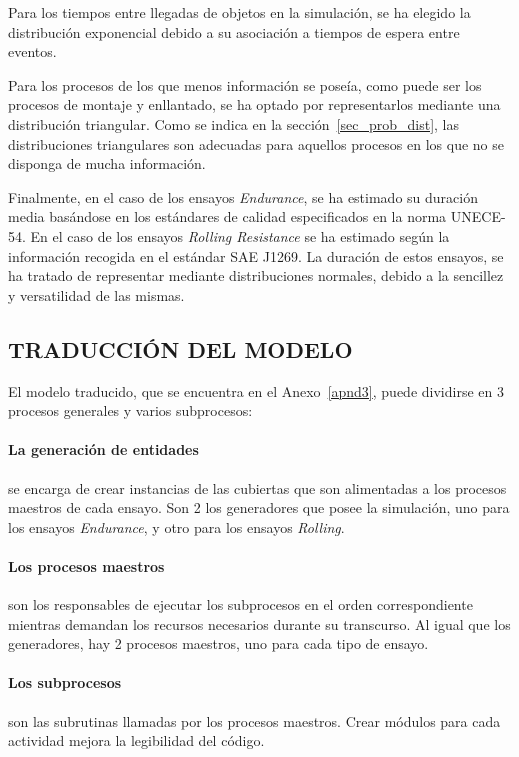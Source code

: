 Para los tiempos entre llegadas de objetos en la simulación,
se ha elegido la distribución exponencial debido a
su asociación a tiempos de espera entre eventos.

Para los procesos de los que menos información se poseía,
como puede ser los procesos de montaje y enllantado,
se ha optado por representarlos mediante una distribución triangular.
Como se indica en la sección~\ref{sec_prob_dist},
las distribuciones triangulares son adecuadas para aquellos procesos en los que no se disponga de mucha información.

Finalmente, en el caso de los ensayos \textit{Endurance},
se ha estimado su duración media basándose en los estándares de calidad
especificados en la norma UNECE-54.
En el caso de los ensayos \textit{Rolling Resistance}
se ha estimado según la información recogida en el estándar SAE J1269.
La duración de estos ensayos,
se ha tratado de representar mediante distribuciones normales,
debido a la sencillez y versatilidad de las mismas.

\subsection{TRADUCCIÓN DEL MODELO}

El modelo traducido, que se encuentra en el Anexo~\ref{apnd3},
puede dividirse en 3 procesos generales y varios subprocesos:

\paragraph{La generación de entidades}
se encarga de crear instancias de las cubiertas que son alimentadas
a los procesos maestros de cada ensayo.
Son 2 los generadores que posee la simulación,
uno para los ensayos \textit{Endurance},
y otro para los ensayos \textit{Rolling}.

\paragraph{Los procesos maestros}
son los responsables de ejecutar los subprocesos
en el orden correspondiente mientras demandan
los recursos necesarios durante su transcurso.
Al igual que los generadores, hay 2 procesos maestros,
uno para cada tipo de ensayo.

\paragraph{Los subprocesos}
son las subrutinas llamadas por los procesos maestros.
Crear módulos para cada actividad mejora la legibilidad del código.

